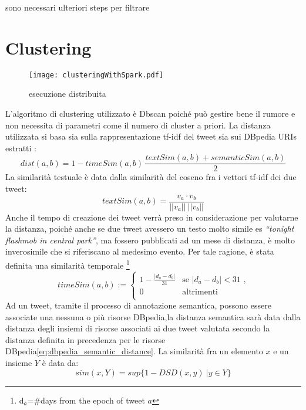  sono necessari ulteriori steps per filtrare 
 
 
\section{Clustering}

 \begin{figure}[h]
    \centering
    \texttt{[image: clusteringWithSpark.pdf]}
    \caption{esecuzione distribuita}
    \label{fig:clusteringWithSpark}
\end{figure}  


L'algoritmo di clustering utilizzato è  Dbscan poiché può gestire bene il rumore e non necessita di parametri come il numero di cluster a priori. La distanza utilizzata si basa sia sulla rappresentazione tf-idf del tweet sia sui DBpedia URIs estratti :
\begin{equation}
dist(a,b)=1- timeSim(a,b)\,\frac{textSim(a,b)+semanticSim(a,b)}{2}
\end{equation}
La similarità testuale è data dalla similarità del coseno fra i vettori tf-idf dei due tweet:
\begin{equation*}
textSim(a,b)=\frac{v_a \cdot  v_b}{||v_a||\:||v_b||}
\end{equation*}
 Anche il tempo di creazione dei tweet verrà preso in considerazione per valutarne la distanza, poiché anche se due tweet avessero un testo molto simile es \emph{“tonight  flashmob in central park”}, ma fossero pubblicati ad un mese di distanza, è molto inverosimile che si riferiscano al medesimo evento. Per tale ragione, è stata definita una similarità temporale  \footnote{d$_a$=\#days from the epoch of tweet $a$}
\begin{equation*} 
timeSim(a,b):=\begin{cases}
1-\frac{|d_a-d_b|}{31} & \text{se $|d_a-d_b|<31 $  ,}\\
0 & \text{altrimenti}\\
\end{cases}
\end{equation*}
Ad un tweet, tramite il processo di annotazione semantica, possono essere associate una nessuna o più risorse DBpedia,la distanza semantica sarà data dalla distanza degli insiemi di risorse associati ai due tweet valutata secondo la distanza definita in precedenza per le risorse DBpedia\ref{eq:dbpedia_semantic_distance}. La similarità fra un elemento $x$ e un insieme $Y$ è data da:
\begin{equation*}
	sim(x,Y)=sup\{1-DSD(x,y)\:| y\in Y \}
\end{equation*}

